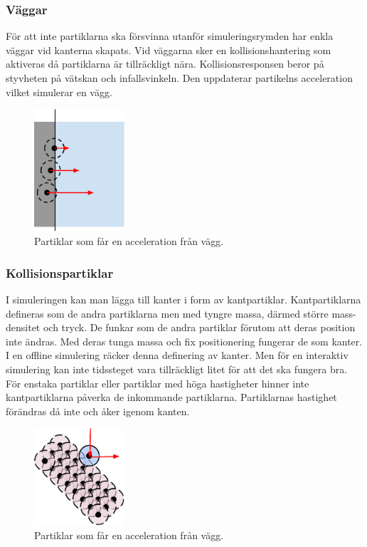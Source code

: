 \documentclass[a4paper,12pt,oneside,final]{extarticle}
\begin{document}
\subsubsection{Väggar}
För att inte partiklarna ska försvinna utanför simuleringsrymden har enkla väggar vid kanterna skapats.
Vid väggarna sker en kollisionshantering som aktiveras då partiklarna är tillräckligt nära.
Kollisionsresponsen beror på styvheten på vätskan och infallsvinkeln.
Den uppdaterar partikelns acceleration vilket simulerar en vägg.
\begin{figure}[H]
  \centering
    \includegraphics[width=0.3\textwidth]{bilder/partiklar_vagg}
  \caption{Partiklar som får en acceleration från vägg.}
\end{figure}

\subsubsection{Kollisionspartiklar}
I simuleringen kan man lägga till kanter i form av kantpartiklar.
Kantpartiklarna defineras som de andra partiklarna men med tyngre massa, därmed större mass-densitet och tryck.
De funkar som de andra partiklar förutom att deras position inte ändras.
Med deras tunga massa och fix positionering fungerar de som kanter.
I en offline simulering räcker denna definering av kanter.
Men för en interaktiv simulering kan inte tidssteget vara tillräckligt litet för att det ska fungera bra.
För enstaka partiklar eller partiklar med höga hastigheter hinner inte kantpartiklarna påverka de inkommande partiklarna.
Partiklarnas hastighet förändras då inte och åker igenom kanten. 

\begin{figure}[H]
  \centering
    \includegraphics[width=0.3\textwidth]{bilder/partiklar_kolpart}
  \caption{Partiklar som får en acceleration från vägg.}
\end{figure}
\end{document}

